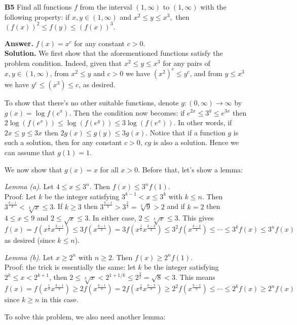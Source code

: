 \documentclass[11pt,a4paper]{article}
\newcommand{\<}{\langle}
\renewcommand{\>}{\rangle}
\begin{document}
\begin{enumerate}
	\item[\textbf{B5}] Find all functions $f$ from the interval $(1,\infty)$ to $(1,\infty)$ with the following property: if $x,y\in(1,\infty)$ and $x^2\le y\le x^3,$ then $(f(x))^2\le f(y) \le (f(x))^3.$ 
	
	\textbf{Answer.} $f(x)=x^c$ for any constant $c>0$. \\
	\textbf{Solution.} We first show that the aforementioned functions satisfy the problem condition. Indeed, given that $x^2\le y\le x^3$ for any pairs of $x, y\in (1, \infty)$, from $x^2\le y$ and $c>0$ we have $(x^{2})^c\le y^c$, and from $y\le x^3$ we have $y^c\le (x^3)\le c$, as desired. 
	
	To show that there's no other suitable functions, denote $g:(0, \infty)\to\infty$ by $g(x)=\log f(e^x)$. Then the condition now becomes: if $e^{2x}\le 3^y\le e^{3x}$ then $2\log(f(e^x))\le \log(f(e^y))\le 3\log(f(e^x))$. In other words, if $2x\le y\le 3x$ then $2g(x)\le g(y)\le 3g(x)$. Notice that if a function $g$ is such a solution, then for any constant $c>0$, $cg$ is also a solution. Hence we can assume that $g(1)=1$. 
	
	We now show that $g(x)=x$ for all $x>0$. Before that, let's show a lemma: 
	
	\emph{Lemma (a)}. Let $4\le x\le 3^n$. Then $f(x)\le 3^nf(1)$. \\
	Proof: Let $k$ be the integer satisfying $3^{k-1}<x\le 3^k$ with $k\le n$. Then $3^{\frac{k-1}{k}}<\sqrt[k]{x}\le 3$. If $k\ge 3$ then $3^{\frac{k-1}{k}}>3^{\frac{2}{3}}=\sqrt[3]{9}>2$ and if $k=2$ then $4\le x\le 9$ and $2\le \sqrt{x}\le 3$. In either case, $2\le \sqrt[k]{x}\le 3$. This gives 
	\[
	f(x)=f(x^{\frac{1}{k}}x^{\frac{k-1}{k}})\le 3f(x^{\frac{k-1}{k}})
	=3f(x^{\frac{1}{k}}x^{\frac{k-2}{k}})\le 3^2f(x^{\frac{k-2}{k}})
	\le\cdots \le 3^kf(x)\le 3^nf(x)
	\]
	as desired (since $k\le n$). 
	
	\emph{Lemma (b)}. Let $x\ge 2^n$ with $n\ge 2$. Then $f(x)\ge 2^nf(1)$. \\
	Proof: the trick is essentially the same: let $k$ be the integer satisfying $2^k\le x<2^{k+1}$, then $2\le \sqrt[k]{x}<2^{1+1/k}\le 2^{\frac{3}{2}}=\sqrt{8}<3$. This means 
	\[
	f(x)=f(x^{\frac{1}{k}}x^{\frac{k-1}{k}})\ge 2f(x^{\frac{k-1}{k}})
	=2f(x^{\frac{1}{k}}x^{\frac{k-2}{k}})\ge 2^2f(x^{\frac{k-2}{k}})
	\le\cdots \le 2^kf(x)\ge 2^nf(x)
	\]
	since $k\ge n$ in this case. 
	
	To solve this problem, we also need another lemma: 
	

\end{enumerate}
\end{document}
